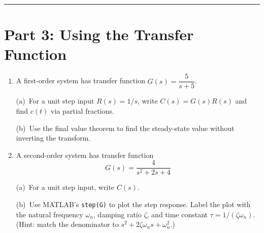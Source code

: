 \documentclass[11pt]{article}
\begin{document}
\bigskip\hrule\bigskip

\section*{Part 3: Using the Transfer Function}

\begin{enumerate}[label=\textbf{\arabic*.}, resume]

\item A first-order system has transfer function $G(s) = \dfrac{5}{s+5}$.

  (a)~For a unit step input $R(s) = 1/s$, write $C(s) = G(s)R(s)$ and find
  $c(t)$ via partial fractions.

  (b)~Use the final value theorem to find the steady-state value without
  inverting the transform.

\item A second-order system has transfer function
\[
  G(s) = \frac{4}{s^2 + 2s + 4}
\]

  (a)~For a unit step input, write $C(s)$.

  (b)~Use MATLAB's \texttt{step(G)} to plot the step response.  Label the plot
  with the natural frequency $\omega_n$, damping ratio $\zeta$, and time
  constant $\tau = 1/(\zeta\omega_n)$.
  (Hint: match the denominator to $s^2 + 2\zeta\omega_n s + \omega_n^2$.)

\end{enumerate}
\end{document}
